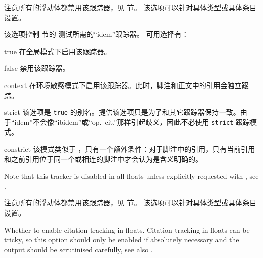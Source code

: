 \begin{optionlist}
注意所有的浮动体都禁用该跟踪器，见  节。
该选项可以针对具体类型或具体条目设置。


该选项控制  节的  测试所需的“idem”跟踪器。
可用选择有：

\begin{valuelist}
\item[true] %
在全局模式下启用该跟踪器。
\item[false] %
禁用该跟踪器。
\item[context] %
在环境敏感模式下启用该跟踪器。此时，脚注和正文中的引用会独立跟踪。
\item[strict] %
该选项是 \texttt{true} 的别名。提供该选项只是为了和其它跟踪器保持一致。由于“idem”不会像“ibidem”或“op.~cit.”那样引起歧义，因此不必使用 \texttt{strict} 跟踪模式。
\item[constrict] %
该模式类似于 ，只有一个额外条件：对于脚注中的引用，只有当前引用和之前引用位于同一个或相连的脚注中才会认为是含义明确的。
\end{valuelist}

Note that this tracker is disabled in all floats unless explicitly requested with , see .

注意所有的浮动体都禁用该跟踪器，见  节。
该选项可以针对具体类型或具体条目设置。


Whether to enable citation tracking in floats. Citation tracking in floats can be tricky, so this option should only be enabled if absolutely necessary and the output should be scrutinised carefully, see also .



\end{optionlist}
